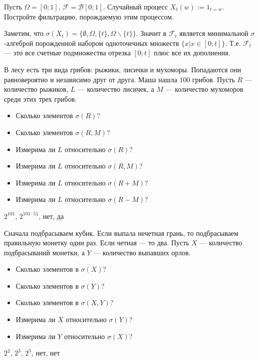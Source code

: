 \begin{problem}
Пусть $\Omega=[0;1]$, $ \mathcal{F}=\mathcal{B}[0;1] $. Случайный процесс $X_{t}(w):=1_{t=w}$. Постройте фильтрацию, порождаемую этим процессом.

\begin{sol}
Заметим, что $\sigma(X_{t})=\{\emptyset,\Omega,\{t\},\Omega\backslash\{t\}\}$. Значит в $ \mathcal{F}_{t} $ является минимальной $\sigma  $-алгеброй порожденной набором одноточечных множеств $\{x|x\in [0;t]\}$. Т.е. $\mathcal{F}_{t}$ — это все счетные подмножества отрезка $[0;t]$ плюс все их дополнения.
\end{sol}
\end{problem}

\begin{problem}
В лесу есть три вида грибов: рыжики, лисички и мухоморы. Попадаются они равновероятно и независимо друг от друга. Маша нашла 100 грибов. Пусть $R$ — количество рыжиков, $L$ — количество лисичек, а $ M $ — количество мухоморов среди этих трех грибов.
\begin{itemize}
\item Сколько элементов $ \sigma(R)$?
\item Сколько элементов $ \sigma(R,M)$?
\item Измерима ли $L$ относительно $ \sigma(R)$?
\item Измерима ли $L$ относительно $ \sigma(R,M)$?
\item Измерима ли $L$ относительно $ \sigma(R+M)$?
\item Измерима ли $L$ относительно $ \sigma(R-M)$?
\end{itemize}

\begin{sol}
$ 2^{101} $, $2^{101\cdot 51}$, нет, да
\end{sol}
\end{problem}

\begin{problem}
Сначала подбрасываем кубик. Если выпала нечетная грань, то подбрасываем правильную монетку один раз. Если четная — то два. Пусть $X$ — количество подбрасываний монетки, а $Y$ — количество выпавших орлов.

\begin{itemize}

\item Сколько элементов в $ \sigma(X)$?
\item Сколько элементов в $ \sigma(Y)$?
\item Сколько элементов в $ \sigma(X,Y)$?
\item Измерима ли $ X $ относительно $ \sigma(Y)$?
\item Измерима ли $ Y $ относительно $ \sigma(X)$?

\end{itemize}

\begin{sol}
 $ 2^{2} $, $ 2^{3} $, $ 2^{5} $, нет, нет
\end{sol}
\end{problem}

